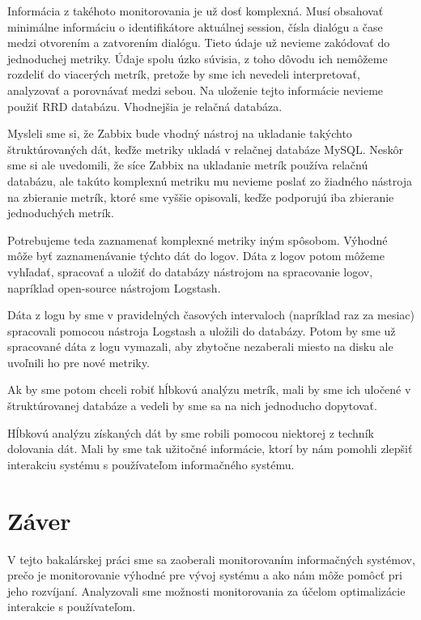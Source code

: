 \documentclass[a4paper, upjsfrontpage, disablespecwarning, thesismargins, thesislinespacing]{rnthesis}
\begin{document}
Informácia z takéhoto monitorovania je už dosť komplexná.
Musí obsahovať minimálne informáciu o identifikátore aktuálnej session, čísla dialógu a čase medzi otvorením a zatvorením dialógu.
Tieto údaje už nevieme zakódovať do jednoduchej metriky.
Údaje spolu úzko súvisia, z toho dôvodu ich nemôžeme rozdeliť do viacerých metrík, 
	pretože by sme ich nevedeli interpretovať, analyzovať a porovnávať medzi sebou.
Na uloženie tejto informácie nevieme použiť RRD databázu.
Vhodnejšia je relačná databáza.

Mysleli sme si, že Zabbix bude vhodný nástroj na ukladanie takýchto štruktúrovaných dát, 
	keďže metriky ukladá v relačnej databáze MySQL.
Neskôr sme si ale uvedomili, že síce Zabbix na ukladanie metrík používa relačnú databázu, ale takúto komplexnú metriku mu nevieme poslať zo žiadného nástroja na zbieranie metrík, ktoré sme vyššie opisovali, keďže podporujú iba zbieranie jednoduchých metrík.

Potrebujeme teda zaznamenať komplexné metriky iným spôsobom.
Výhodné môže byť zaznamenávanie týchto dát do logov.
Dáta z logov potom môžeme vyhľadať, spracovať a uložiť do databázy nástrojom na spracovanie logov, napríklad open-source nástrojom Logstash.

Dáta z logu by sme v pravidelných časových intervaloch (napríklad raz za mesiac) spracovali pomocou nástroja Logstash a uložili do databázy.
Potom by sme už spracované dáta z logu vymazali, aby zbytočne nezaberali miesto na disku ale uvoľnili ho pre nové metriky.

Ak by sme potom chceli robiť hĺbkovú analýzu metrík, mali by sme ich uločené v štruktúrovanej databáze a vedeli by sme sa na nich jednoducho dopytovať.

Hĺbkovú analýzu získaných dát by sme robili pomocou niektorej z techník dolovania dát.
Mali by sme tak užitočné informácie, ktorí by nám pomohli zlepšiť interakciu systému s používateľom informačného systému.


\newpage


\chapter*{Záver}

V tejto bakalárskej práci sme sa zaoberali monitorovaním informačných systémov, prečo je monitorovanie výhodné pre vývoj systému a ako nám môže pomôcť pri jeho rozvíjaní.
Analyzovali sme možnosti monitorovania za účelom optimalizácie interakcie s používateľom.
\end{document}
